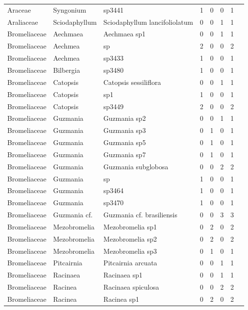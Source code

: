\documentclass[a4paper,12pt]{article}
\begin{document}
\begin{table}[H]
\begin{tabular}{llllcccc}
        Araceae & Syngonium & sp3441 & 1 & 0 & 0 & 1 \\
        Araliaceae & Sciodaphyllum & Sciodaphyllum lancifoliolatum & 0 & 0 & 1 & 1 \\
        Bromeliaceae & Aechmaea & Aechmaea sp1 & 0 & 0 & 1 & 1 \\
        Bromeliaceae & Aechmea & sp & 2 & 0 & 0 & 2 \\
        Bromeliaceae & Aechmea & sp3433 & 1 & 0 & 0 & 1 \\
        Bromeliaceae & Bilbergia & sp3480 & 1 & 0 & 0 & 1 \\
        Bromeliaceae & Catopsis & Catopsis sessiliflora & 0 & 0 & 1 & 1 \\
        Bromeliaceae & Catopsis & sp1 & 1 & 0 & 0 & 1 \\
        Bromeliaceae & Catopsis & sp3449 & 2 & 0 & 0 & 2 \\
        Bromeliaceae & Guzmania & Guzmania sp2 & 0 & 0 & 1 & 1 \\
        Bromeliaceae & Guzmania & Guzmania sp3 & 0 & 1 & 0 & 1 \\
        Bromeliaceae & Guzmania & Guzmania sp5 & 0 & 1 & 0 & 1 \\
        Bromeliaceae & Guzmania & Guzmania sp7 & 0 & 1 & 0 & 1 \\
        Bromeliaceae & Guzmania & Guzmania subglobosa & 0 & 0 & 2 & 2 \\
        Bromeliaceae & Guzmania & sp & 1 & 0 & 0 & 1 \\
        Bromeliaceae & Guzmania & sp3464 & 1 & 0 & 0 & 1 \\
        Bromeliaceae & Guzmania & sp3470 & 1 & 0 & 0 & 1 \\
        Bromeliaceae & Guzmania cf. & Guzmania cf. brasiliensis & 0 & 0 & 3 & 3 \\
        Bromeliaceae & Mezobromelia & Mezobromelia sp1 & 0 & 2 & 0 & 2 \\
        Bromeliaceae & Mezobromelia & Mezobromelia sp2 & 0 & 2 & 0 & 2 \\
        Bromeliaceae & Mezobromelia & Mezobromelia sp3 & 0 & 1 & 0 & 1 \\
        Bromeliaceae & Pitcairnia & Pitcairnia arcuata & 0 & 0 & 1 & 1 \\
        Bromeliaceae & Racinaea & Racinaea sp1 & 0 & 0 & 1 & 1 \\
        Bromeliaceae & Racinea & Racinaea spiculosa & 0 & 0 & 2 & 2 \\
        Bromeliaceae & Racinea & Racinea sp1 & 0 & 2 & 0 & 2 \\

\end{tabular}
\end{table}
\end{document}
